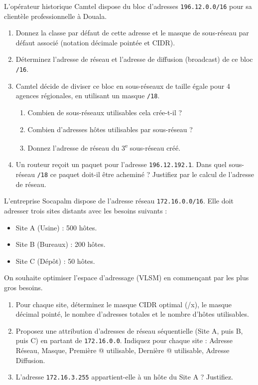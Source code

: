 \documentclass[11pt]{article}
\begin{document}
\begin{exercice}
L'opérateur historique Camtel dispose du bloc d'adresses \texttt{196.12.0.0/16} pour sa clientèle professionnelle à Douala.

\begin{enumerate}
    \item Donnez la classe par défaut de cette adresse et le masque de sous-réseau par défaut associé (notation décimale pointée et CIDR).
    \item Déterminez l'adresse de réseau et l'adresse de diffusion (broadcast) de ce bloc \texttt{/16}.
    \item Camtel décide de diviser ce bloc en sous-réseaux de taille égale pour 4 agences régionales, en utilisant un masque \texttt{/18}.
    \begin{enumerate}
        \item Combien de sous-réseaux utilisables cela crée-t-il ?
        \item Combien d'adresses hôtes utilisables par sous-réseau ?
        \item Donnez l'adresse de réseau du 3\textsuperscript{e} sous-réseau créé.
    \end{enumerate}
    \item Un routeur reçoit un paquet pour l'adresse \texttt{196.12.192.1}. Dans quel sous-réseau \texttt{/18} ce paquet doit-il être acheminé ? Justifiez par le calcul de l'adresse de réseau.
\end{enumerate}
\end{exercice}

\begin{exercice}
L'entreprise Socapalm dispose de l'adresse réseau \texttt{172.16.0.0/16}. Elle doit adresser trois sites distants avec les besoins suivants :
\begin{itemize}
    \item Site A (Usine) : 500 hôtes.
    \item Site B (Bureaux) : 200 hôtes.
    \item Site C (Dépôt) : 50 hôtes.
\end{itemize}
On souhaite optimiser l'espace d'adressage (VLSM) en commençant par les plus gros besoins.

\begin{enumerate}
    \item Pour chaque site, déterminez le masque CIDR optimal (/x), le masque décimal pointé, le nombre d'adresses totales et le nombre d'hôtes utilisables.
    \item Proposez une attribution d'adresses de réseau séquentielle (Site A, puis B, puis C) en partant de \texttt{172.16.0.0}. Indiquez pour chaque site : Adresse Réseau, Masque, Première @ utilisable, Dernière @ utilisable, Adresse Diffusion.
    \item L'adresse \texttt{172.16.3.255} appartient-elle à un hôte du Site A ? Justifiez.
\end{enumerate}
\end{exercice}
\end{document}
